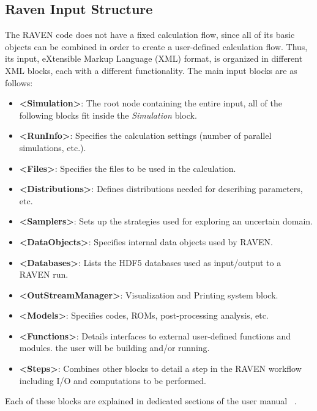\subsection{Raven Input Structure}
\label{sub:InputStructure}
The RAVEN code does not have a fixed calculation flow, since all of its basic
objects can be combined in order to create a user-defined calculation flow.
%
Thus, its input, eXtensible Markup Language (XML) format, is organized in different XML blocks, each with a
different functionality.
%
The main input blocks are as follows:
\begin{itemize}
  \item \textbf{\textless Simulation\textgreater}: The root node containing the
  entire input, all of
  the following blocks fit inside the \emph{Simulation} block.
  \item \textbf{\textless RunInfo\textgreater}: Specifies the calculation
  settings (number of parallel simulations, etc.).
  \item \textbf{\textless Files\textgreater}: Specifies the files to be
  used in the calculation.
  \item \textbf{\textless Distributions\textgreater}: Defines distributions
  needed for describing parameters, etc.
  \item \textbf{\textless Samplers\textgreater}: Sets up the strategies used for
  exploring an uncertain domain.
  \item \textbf{\textless DataObjects\textgreater}: Specifies internal data objects
  used by RAVEN.
  \item \textbf{\textless Databases\textgreater}: Lists the HDF5 databases used
  as input/output to a
  RAVEN run.
  \item \textbf{\textless OutStreamManager\textgreater}: Visualization and
  Printing system block.
  \item \textbf{\textless Models\textgreater}: Specifies codes, ROMs,
  post-processing analysis, etc.
  \item \textbf{\textless Functions\textgreater}: Details interfaces to external
  user-defined functions and modules.
  the user will be building and/or running.
  \item \textbf{\textless Steps\textgreater}: Combines other blocks to detail a
  step in the RAVEN workflow including I/O and computations to be performed.
\end{itemize}

Each of these blocks are explained in dedicated sections of the user manual ~\cite{RAVENuserManual}.
%